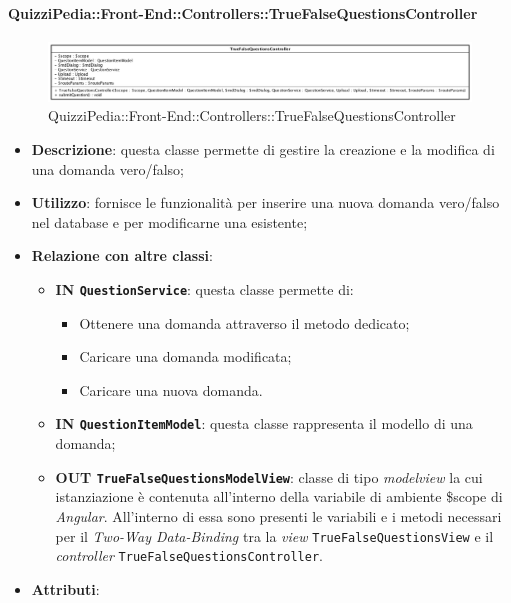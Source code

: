 \paragraph{QuizziPedia::Front-End::Controllers::TrueFalseQuestionsController}
\begin{figure} [ht]
	\centering
	\includegraphics[scale=0.3]{UML/Classi/Front-End/QuizziPedia_Front-end_Controller_TrueFalseQuestionsController.png}
	\caption{QuizziPedia::Front-End::Controllers::TrueFalseQuestionsController}
\end{figure} \FloatBarrier
\begin{itemize}
	\item \textbf{Descrizione}: questa classe permette di gestire la creazione e la modifica di una domanda vero/falso;
	\item \textbf{Utilizzo}: fornisce le funzionalità per inserire una nuova domanda vero/falso nel database e per modificarne una esistente;
	\item \textbf{Relazione con altre classi}:
	\begin{itemize}
		\item \textbf{IN \texttt{QuestionService}}: questa classe permette di:
			\begin{itemize}
				\item Ottenere una domanda attraverso il metodo dedicato;
				\item Caricare una domanda modificata;
				\item Caricare una nuova domanda.
			\end{itemize}
		\item \textbf{IN \texttt{QuestionItemModel}}: questa classe rappresenta il modello di una domanda;
		\item \textbf{OUT \texttt{TrueFalseQuestionsModelView}}: classe di tipo \textit{modelview} la cui istanziazione è contenuta all'interno della variabile di ambiente \$scope di \textit{Angular}. All'interno di essa sono presenti le variabili e i metodi necessari per il \textit{Two-Way Data-Binding} tra la \textit{view} \texttt{TrueFalseQuestionsView} e il \textit{controller} \texttt{TrueFalseQuestionsController}.
	\end{itemize}
	\item \textbf{Attributi}:
	\begin{itemize}

\end{itemize}
\end{itemize}
